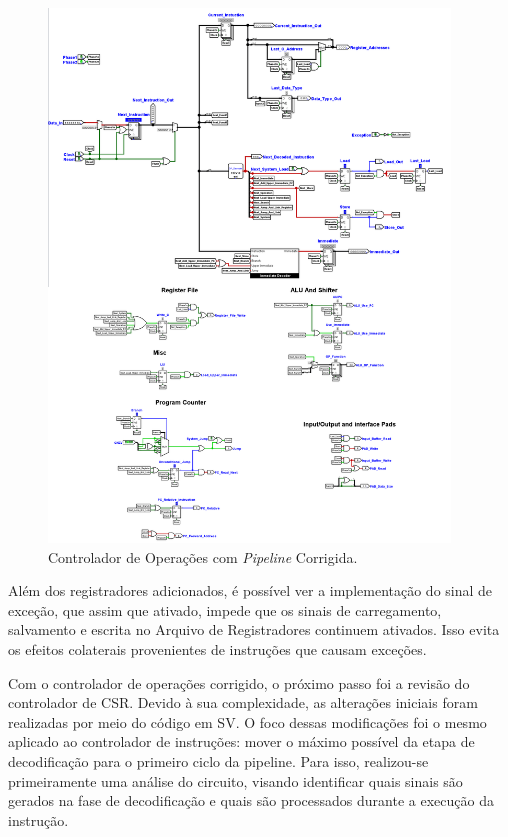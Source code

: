 \documentclass[
	12pt,				%
	openright,			%
	oneside,			%
	a4paper,			%
	english,			%
	french,				%
	spanish,			%
	brazil,				%
	]{abntex2}
\begin{document}
\begin{figure}[h]
    \centering
    \includegraphics[width=0.95\textwidth]{ProcessoDesenvolvimento/Arquitetura/Controlador_Pipeline_Fix.png}
    \caption{Controlador de Operações com \textit{Pipeline} Corrigida.}
    \label{fig:Controlador_Pipeline_Fix}
\end{figure}

Além dos registradores adicionados, é possível ver a implementação do sinal de exceção, que assim que ativado, impede que os sinais de carregamento, salvamento e escrita no Arquivo de Registradores continuem ativados. Isso evita os efeitos colaterais provenientes de instruções que causam exceções.

Com o controlador de operações corrigido, o próximo passo foi a revisão do controlador de CSR. Devido à sua complexidade, as alterações iniciais foram realizadas por meio do código em SV. O foco dessas modificações foi o mesmo aplicado ao controlador de instruções: mover o máximo possível da etapa de decodificação para o primeiro ciclo da pipeline. Para isso, realizou-se primeiramente uma análise do circuito, visando identificar quais sinais são gerados na fase de decodificação e quais são processados durante a execução da instrução.
\end{document}
